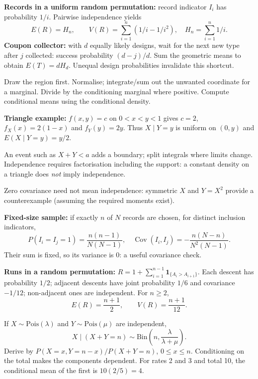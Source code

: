 \documentclass[10pt]{article}
\newcommand{\ind}[1]{\mathbf 1_{\{#1\}}}
\newcommand{\boxstart}[1]{\begin{tcolorbox}[title={#1},sharp corners]}
\newcommand{\boxend}{\end{tcolorbox}}
\begin{document}
\begin{multicols*}{3}
\boxstart{Ch. 2 --- Records and coupon collection}
\textbf{Records in a uniform random permutation:} record indicator $I_i$ has probability $1/i$. Pairwise independence yields
\[
E(R)=H_n,\qquad V(R)=\sum_{i=1}^n(1/i-1/i^2),\quad H_n=\sum_{i=1}^n1/i.
\]
\textbf{Coupon collector:} with $d$ equally likely designs, wait for the next new type after $j$ collected: success probability $(d-j)/d$. Sum the geometric means to obtain $E(T)=dH_d$. Unequal design probabilities invalidate this shortcut.

\boxend

\boxstart{Ch. 3 --- Joint support, marginals and conditionals}
Draw the region first. Normalise; integrate/sum out the unwanted coordinate for a marginal. Divide by the conditioning marginal where positive. Compute conditional means using the conditional density.

\textbf{Triangle example:} $f(x,y)=c$ on $0<x<y<1$ gives $c=2$, $f_X(x)=2(1-x)$ and $f_Y(y)=2y$. Thus $X\mid Y=y$ is uniform on $(0,y)$ and $E(X\mid Y=y)=y/2$.

An event such as $X+Y<a$ adds a boundary; split integrals where limits change. Independence requires factorisation including the support: a constant density on a triangle does \emph{not} imply independence.
\boxend

\boxstart{Ch. 3 --- Dependence patterns and checks}
Zero covariance need not mean independence: symmetric $X$ and $Y=X^2$ provide a counterexample (assuming the required moments exist).

\textbf{Fixed-size sample:} if exactly $n$ of $N$ records are chosen, for distinct inclusion indicators,
\[
P(I_i=I_j=1)=\frac{n(n-1)}{N(N-1)},\quad
\operatorname{Cov}(I_i,I_j)=-\frac{n(N-n)}{N^2(N-1)}.
\]
Their sum is fixed, so its variance is 0: a useful covariance check.

\textbf{Runs in a random permutation:} $R=1+\sum_{i=1}^{n-1}\ind{A_i>A_{i+1}}$. Each descent has probability $1/2$; adjacent descents have joint probability $1/6$ and covariance $-1/12$; non-adjacent ones are independent. For $n\ge2$,
\[
E(R)=\frac{n+1}{2},\qquad V(R)=\frac{n+1}{12}.
\]
\boxend

\boxstart{Ch. 3/4 --- Independent Poissons given their sum}
If $X\sim\mathrm{Pois}(\lambda)$ and $Y\sim\mathrm{Pois}(\mu)$ are independent,
\[
X\mid(X+Y=n)\sim\mathrm{Bin}\left(n,\frac{\lambda}{\lambda+\mu}\right).
\]
Derive by $P(X=x,Y=n-x)/P(X+Y=n)$, $0\le x\le n$. Conditioning on the total makes the components dependent. For rates 2 and 3 and total 10, the conditional mean of the first is $10(2/5)=4$.
\boxend


\end{multicols*}
\end{document}
